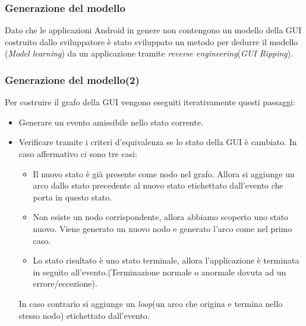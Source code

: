 \documentclass[12pt]{beamer}
\begin{document}
\begin{frame}
    \frametitle{Generazione del modello}
Dato che le applicazioni Android in genere non contengono un modello della GUI costruito dallo sviluppatore \`e stato sviluppato un metodo per dedurre il modello (\emph{Model learning}) da un applicazione tramite \emph{reverse engineering}(\emph{GUI Ripping}).
\end{frame}

\begin{frame}
    \frametitle{Generazione del modello(2)}

Per costruire il grafo della GUI vengono eseguiti iterativamente questi passaggi:
\begin{itemize}
    \item Generare un evento amissibile nello stato corrente.
    \item Verificare tramite i criteri d'equivalenza se lo stato della GUI \`e cambiato.
        In caso affermativo ci sono tre casi:
        \begin{itemize}
            \item Il nuovo stato \`e gi\`a presente come nodo nel grafo. Allora si aggiunge un arco dallo stato precedente al nuovo stato etichettato dall'evento che porta in questo stato.
            \item Non esiste un nodo corrispondente, allora abbiamo scoperto uno stato nuovo. Viene generato un nuovo nodo e generato l'arco come nel primo caso.
            \item Lo stato risultato \`e uno stato terminale, allora l'applicazione \`e terminata in seguito all'evento.(Terminazione normale o anormale dovuta ad un errore/eccezione).
        \end{itemize}
        In caso contrario si aggiunge un \emph{loop}(un arco che origina e termina nello stesso nodo) etichettato dall'evento.

\end{itemize}

\end{frame}
\end{document}
